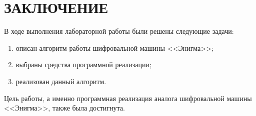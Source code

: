 \chapter*{ЗАКЛЮЧЕНИЕ}

В ходе выполнения лабораторной работы были решены следующие задачи:

\begin{enumerate}[label={\arabic*)}]
	\item описан алгоритм работы шифровальной машины <<Энигма>>;
	\item выбраны средства программной реализации;
	\item реализован данный алгоритм.
\end{enumerate}

Цель работы, а именно программная реализация аналога шифровальной машины <<Энигма>>, также была достигнута.
